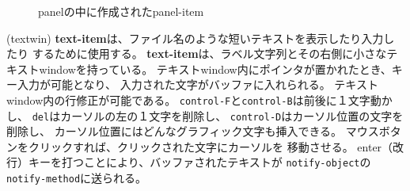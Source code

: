 \begin{figure}
\begin{center}
\end{center}
\caption{panelの中に作成されたpanel-item\label{panelitem}}
\end{figure}

\begin{refdesc}
{(textwin)}{
{\bf text-item}は、ファイル名のような短いテキストを表示したり入力したり
するために使用する。
{\bf text-item}は、ラベル文字列とその右側に小さなテキストwindowを持っている。
テキストwindow内にポインタが置かれたとき、キー入力が可能となり、
入力された文字がバッファに入れられる。
テキストwindow内の行修正が可能である。
{\tt control-F}と{\tt control-B}は前後に１文字動かし、
{\tt del}はカーソルの左の１文字を削除し、
{\tt control-D}はカーソル位置の文字を削除し、
カーソル位置にはどんなグラフィック文字も挿入できる。
マウスボタンをクリックすれば、クリックされた文字にカーソルを
移動させる。
enter（改行）キーを打つことにより、バッファされたテキストが
{\tt notify-object}の{\tt notify-method}に送られる。}




\end{refdesc}

